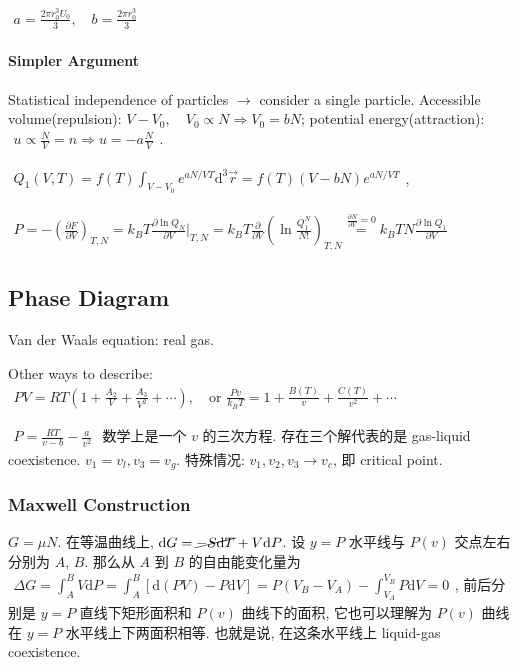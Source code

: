 \documentclass[../../main.tex]{subfiles}
\begin{document}
$\begin{aligned}
    a = \frac{2\pi r_{0}^{3}U_{0}}{3},\quad b = \frac{2\pi r_{0}^{3}}{3}
\end{aligned}$

\paragraph{Simpler Argument}
Statistical independence of particles $\rightarrow$ consider a single particle. Accessible volume(repulsion): $V - V_{0}, \quad V_{0}\propto N\Rightarrow V_{0} = bN$; potential energy(attraction): $\begin{aligned}
    u\propto \frac{N}{V} = n\Rightarrow u = -a\frac{N}{V}
\end{aligned}$. 

$\begin{aligned}
    Q_{1}(V,T) = f(T)\int_{V-V_{0}} e^{aN/VT}\mathrm{d}^{3}\vec{r} = f(T)(V-bN)e^{aN/VT}
\end{aligned}$, 

$\begin{aligned}
    P = -\left(\frac{\partial F}{\partial V}\right)_{T,N} = k_{B}T\frac{\partial\ln{Q_{N}}}{\partial V}\bigg|_{T,N} =  k_{B}T \frac{\partial}{\partial V}\left(\ln{\frac{Q_{1}^{N}}{N!}}\right)_{T,N}\stackrel{\frac{\partial N}{\partial V}=0}{=} k_{B}TN\frac{\partial\ln{Q_{1}}}{\partial V}
\end{aligned}$

\subsection{Phase Diagram}
Van der Waals equation: real gas. 

Other ways to describe: $\begin{aligned}
    PV = RT\left(1 + \frac{A_{2}}{V} + \frac{A_{3}}{V^{2}} + \cdots\right),\quad \text{or }\frac{Pv}{k_{B}T} = 1 + \frac{B(T)}{v} + \frac{C(T)}{v^{2}} + \cdots
\end{aligned}$

$\begin{aligned}
    P = \frac{RT}{v-b}-\frac{a}{v^{2}}
\end{aligned}$ 数学上是一个 $v$ 的三次方程. 存在三个解代表的是 gas-liquid coexistence. $v_{1} = v_{l}, v_{3} = v_{g}$. 特殊情况: $v_{1},v_{2},v_{3}\rightarrow v_{c}$, 即 critical point. 

\subsubsection{Maxwell Construction}
 $G = \mu N$. 在等温曲线上, $\mathrm{d}G = \cancel{-S\mathrm{d}T} + V\mathrm{d}P$. 设 $y = P$ 水平线与 $P(v)$ 交点左右分别为 $A$, $B$. 那么从 $A$ 到 $B$ 的自由能变化量为 $\begin{aligned}
    \Delta G = \int_{A}^{B}V\mathrm{d}P = \int_{A}^{B}[\mathrm{d}(PV) - P\mathrm{d}V] = P(V_{B}-V_{A}) - \int_{V_{A}}^{V_{B}}P\mathrm{d}V = 0
 \end{aligned}$, 前后分别是 $y=P$ 直线下矩形面积和 $P(v)$ 曲线下的面积, 它也可以理解为 $P(v)$ 曲线在 $y=P$ 水平线上下两面积相等. 也就是说, 在这条水平线上 liquid-gas coexistence.
\end{document}
